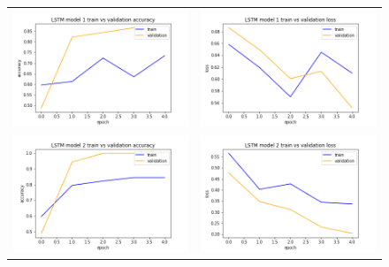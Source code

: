 \begin{figure}
   \centering
\begin{tabular}{cc}
\includegraphics[width=6.5cm]{images/classifier/model-output-lstm-339/model-1-train-vs-validation-accuracy}&
\includegraphics[width=6.5cm]{images/classifier/model-output-lstm-339/model-1-train-vs-validation-loss}\\

\includegraphics[width=6.5cm]{images/classifier/model-output-lstm-339/model-2-train-vs-validation-accuracy}&
\includegraphics[width=6.5cm]{images/classifier/model-output-lstm-339/model-2-train-vs-validation-loss}\\


\end{tabular}
\end{figure}
